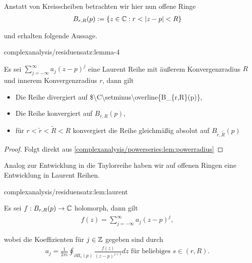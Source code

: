 \par
Anstatt von Kreisscheiben betrachten wir hier nun offene Ringe
\begin{align*}
B_{r,R}(p) := \{z\in \mathbb{C}: r< \vert z-p \vert < R\}
\end{align*}
\par
und erhalten folgende Aussage.
\begin{lemma}{}{complexanalysis/residuensatz:lemma-4}



\par
Es sei \(\sum_{j=-\infty}^\infty a_j (z-p)^j\) eine Laurent Reihe mit äußerem Konvergenzradius \(R\) und innerem Konvergenzradius \(r\), dann gilt
\begin{itemize}
\item {} 
\par
Die Reihe divergiert auf \$\textbackslash{}C\textbackslash{}setminus\textbackslash{}overline\{B\_\{r,R\}(p)\},

\item {} 
\par
Die Reihe konvergiert auf \(B_{r,R}(p)\),

\item {} 
\par
für \(r<\tilde{r}<\tilde{R}< R\) konvergiert die Reihe gleichmäßig absolut auf \(B_{\tilde{r},\tilde{R}}(p)\)

\end{itemize}
\end{lemma}

\begin{proof}
 Folgt direkt aus \cref{complexanalysis/powerseries:lem:powerradius} \end{proof}

\par
Analog zur Entwicklung in die Taylorreihe haben wir auf offenen Ringen eine Entwicklung in Laurent Reihen.
\begin{lemma}{}{complexanalysis/residuensatz:lem:laurent}



\par
Es sei \(f:B_{r,R}(p)\to\mathbb{C}\) holomorph, dann gilt
\begin{align*}
f(z) = \sum_{j=-\infty}^\infty a_j (z-p)^j,
\end{align*}
\par
wobei die Koeffizienten für \(j\in\mathbb{Z}\) gegeben sind durch
\begin{align*}
a_j = \frac{1}{2\pi i} \oint_{\partial B_s(p)} \frac{f(z)}{(z-p)^{j+1}} dz \text{ für beliebiges } s\in (r,R).
\end{align*}\end{lemma}


